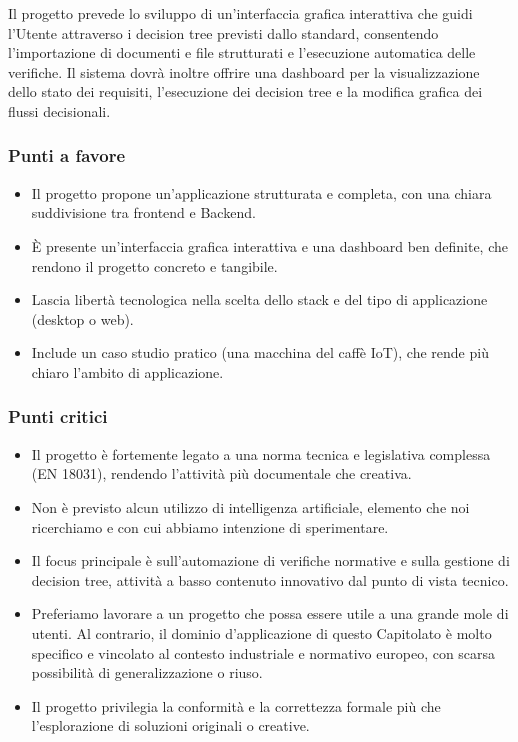\documentclass[a4paper,12pt]{article}
\begin{document}
Il progetto prevede lo sviluppo di un’interfaccia grafica interattiva che guidi l’Utente attraverso i decision tree previsti dallo standard, consentendo l’importazione di documenti e file strutturati e l’esecuzione automatica delle verifiche. Il sistema dovrà inoltre offrire una dashboard per la visualizzazione dello stato dei requisiti, l’esecuzione dei decision tree e la modifica grafica dei flussi decisionali.

\subsubsection{Punti a favore}
\begin{itemize}
    \item Il progetto propone un’applicazione strutturata e completa, con una chiara suddivisione tra frontend e Backend.
    \item È presente un’interfaccia grafica interattiva e una dashboard ben definite, che rendono il progetto concreto e tangibile.
    \item Lascia libertà tecnologica nella scelta dello stack e del tipo di applicazione (desktop o web).
    \item Include un caso studio pratico (una macchina del caffè IoT), che rende più chiaro l’ambito di applicazione.
\end{itemize}

\subsubsection{Punti critici}
\begin{itemize}
    \item Il progetto è fortemente legato a una norma tecnica e legislativa complessa (EN 18031), rendendo l’attività più documentale che creativa.
    \item Non è previsto alcun utilizzo di intelligenza artificiale, elemento che noi ricerchiamo e con cui abbiamo intenzione di sperimentare.
    \item Il focus principale è sull’automazione di verifiche normative e sulla gestione di decision tree, attività a basso contenuto innovativo dal punto di vista tecnico.
    \item Preferiamo lavorare a un progetto che possa essere utile a una grande mole di utenti. Al contrario, il dominio d’applicazione di questo Capitolato è molto specifico e vincolato al contesto industriale e normativo europeo, con scarsa possibilità di generalizzazione o riuso.
    \item Il progetto privilegia la conformità e la correttezza formale più che l’esplorazione di soluzioni originali o creative.
\end{itemize}
\end{document}
